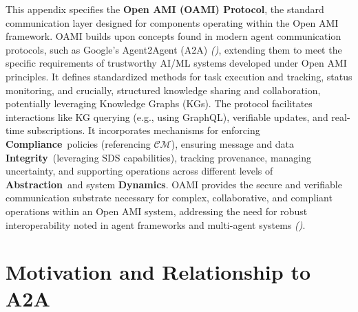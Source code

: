 \documentclass[12pt,a4paper]{report}
\renewcommand{\citep}[1]{\textit{\scriptsize{(\cite{#1})}}}
\newcommand{\Compliance}{\textbf{Compliance}}
\newcommand{\Integrity}{\textbf{Integrity}}
\newcommand{\Abstraction}{\textbf{Abstraction}}
\newcommand{\Dynamics}{\textbf{Dynamics}}
\begin{document}
	This appendix specifies the \textbf{Open AMI (OAMI) Protocol}, the standard communication layer designed for components operating within the Open AMI framework. OAMI builds upon concepts found in modern agent communication protocols, such as Google's Agent2Agent (A2A) \citep{A2A_README}, extending them to meet the specific requirements of trustworthy AI/ML systems developed under Open AMI principles. It defines standardized methods for task execution and tracking, status monitoring, and crucially, structured knowledge sharing and collaboration, potentially leveraging Knowledge Graphs (KGs). The protocol facilitates interactions like KG querying (e.g., using GraphQL), verifiable updates, and real-time subscriptions. It incorporates mechanisms for enforcing \Compliance\ policies (referencing $\mathcal{CM}$), ensuring message and data \Integrity\ (leveraging SDS capabilities), tracking provenance, managing uncertainty, and supporting operations across different levels of \Abstraction\ and system \Dynamics. OAMI provides the secure and verifiable communication substrate necessary for complex, collaborative, and compliant operations within an Open AMI system, addressing the need for robust interoperability noted in agent frameworks and multi-agent systems \citep{AdditionalCitationRef52}.
	
	\section{Motivation and Relationship to A2A}
	\label{app:oami_motivation}
	
\end{document}
